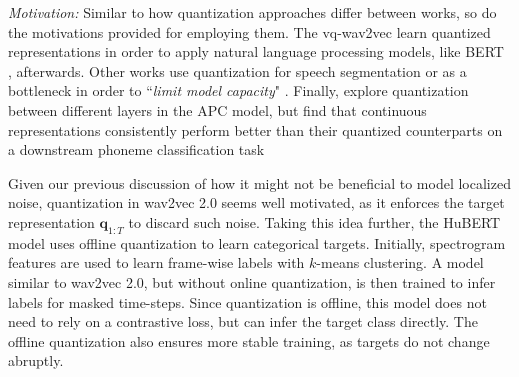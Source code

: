 
\textit{Motivation:} Similar to how quantization approaches differ between works, so do the motivations provided for employing them. The vq-wav2vec \cite{baevski2019vq, baevski2019effectiveness} %
learn quantized representations in order to apply natural language processing models, like BERT \cite{devlin2019bert}, afterwards. Other works use quantization for speech segmentation \cite{kamper2020towards, chorowski2019unsupervised} or as a bottleneck in order to ``\textit{limit model capacity}" \cite{chung2020vector, ling2020decoar}.
Finally, \citet{chung2020vector} explore quantization between different layers in the APC model, but find that continuous representations consistently perform better than their quantized counterparts on a downstream phoneme classification task



Given our previous discussion of how it might not be beneficial to model localized noise, quantization in wav2vec 2.0 seems well motivated, as it enforces the target representation $\mathbf{q}_{1:T}$ to discard such noise. Taking this idea further, the HuBERT model \cite{hsu2021hubert} uses offline quantization to learn categorical targets. Initially, spectrogram features are used to learn frame-wise labels with $k$-means clustering. A model similar to wav2vec 2.0, but without online quantization, is then trained to infer labels for masked time-steps. Since quantization is offline, this model does not need to rely on a contrastive loss, but can infer the target class directly. The offline quantization also ensures more stable training, as targets do not change abruptly.



